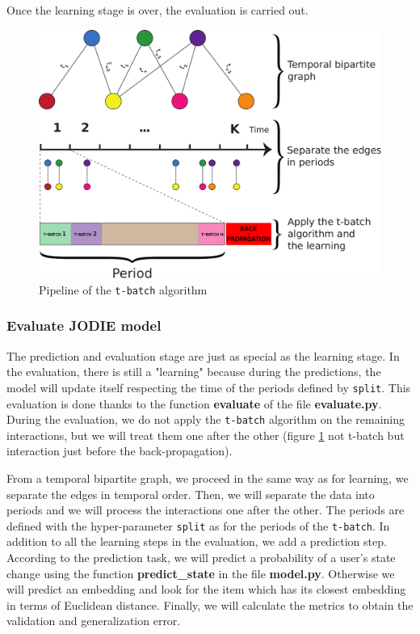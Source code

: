 Once the learning stage is over, the evaluation is carried out.


\begin{figure}[H]
    \centering
    \includegraphics[width=.7\textwidth]{image/pipeline_t-batch.pdf}
    \caption{Pipeline of the \texttt{t-batch} algorithm}
    \label{pipeline_t-batch}
\end{figure}

\subsubsection{Evaluate JODIE model}

The prediction and evaluation stage are just as special as the learning stage. In the evaluation, there is still a "learning" because during the predictions, the model will update itself respecting the time of the periods defined by \texttt{split}. This evaluation is done thanks to the function \textbf{evaluate} of the file \textbf{evaluate.py}. During the evaluation, we do not apply the \texttt{t-batch} algorithm on the remaining interactions, but we will treat them one after the other (figure \ref{pipeline_t-batch} not t-batch but interaction just before the back-propagation).

From a temporal bipartite graph, we proceed in the same way as for learning, we separate the edges in temporal order. Then, we will separate the data into periods and we will process the interactions one after the other. The periods are defined with the hyper-parameter \texttt{split} as for the periods of the \texttt{t-batch}. In addition to all the learning steps in the evaluation, we add a prediction step. According to the prediction task, we will predict a probability of a user's state change using the function \textbf{predict\_state} in the file \textbf{model.py}. Otherwise we will predict an embedding and look for the item which has its closest embedding in terms of Euclidean distance. Finally, we will calculate the metrics to obtain the validation and generalization error.

